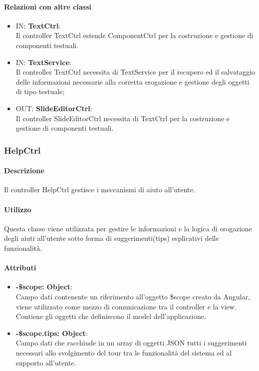 	\paragraph{Relazioni con altre classi}
	\begin{itemize}
 	\item IN: \textbf{TextCtrl}:\\
	 	Il controller TextCtrl estende ComponentCtrl per la costruzione e gestione di componenti testuali.
	\item IN: \textbf{TextService}:\\
		Il controller TextCtrl necessita di TextService per il recupero ed il salvataggio delle informazioni necessarie alla corretta erogazione e gestione degli oggetti di tipo testuale;
	\item OUT: \textbf{SlideEditorCtrl}:\\
		Il controller SlideEditorCtrl necessita di TextCtrl per la costruzione e gestione di componenti testuali. 	
	\end{itemize}

\newpage

\subsubsection{HelpCtrl}
      \paragraph{Descrizione}
	Il controller HelpCtrl gestisce i meccanismi di aiuto all'utente.
	
	\paragraph{Utilizzo}
	Questa classe viene utilizzata per gestire le informazioni e la logica di erogazione degli aiuti all'utente sotto forma di suggerimenti(tips) esplicativi delle funzionalità.
	
	\paragraph{Attributi}
	\begin{itemize}
		\item \textbf{-\$scope: Object}:\\
				Campo dati contenente un riferimento all'oggetto \$scope creato da Angular, viene utilizzato come mezzo di comunicazione tra il controller e la view. Contiene gli oggetti che definiscono il model dell'applicazione.
		\item \textbf{-\$scope.tips: Object}:\\
				Campo dati che racchiude in un array di oggetti JSON tutti i suggerimenti necessari allo svolgimento del tour tra le funzionalità del sistema ed al supporto all'utente. 
	\end{itemize}
	
